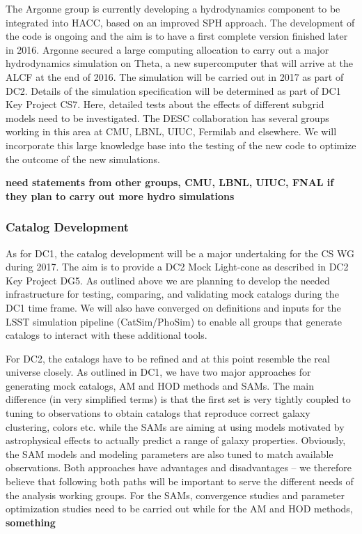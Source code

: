 The Argonne group is currently developing a hydrodynamics component to be integrated into HACC, based on an improved SPH approach. The development of the code is ongoing and the aim is to have a first complete version finished later in 2016. Argonne secured a large computing allocation to carry out a major hydrodynamics simulation on Theta, a new supercomputer that will arrive at the ALCF at the end of 2016. The simulation will be carried out in 2017 as part of DC2. Details of the simulation specification will be determined as part of DC1 Key Project CS7. Here, detailed tests about the effects of different subgrid models need to be investigated. The DESC collaboration has several groups working in this area at CMU, LBNL, UIUC, Fermilab and elsewhere. We will incorporate this large knowledge base into the testing of the new code to optimize the outcome of the new simulations.


{\bf need statements from other groups, CMU, LBNL, UIUC, FNAL if they plan to carry out more hydro simulations}

\subsubsection{Catalog Development}
\label{sec:keysims:dc2:dev}

As for DC1, the catalog development will be a major undertaking for the CS WG during 2017. The aim is to provide a DC2 Mock Light-cone as described in DC2 Key Project DG5. As outlined above we are planning to develop the needed infrastructure for testing, comparing, and validating mock catalogs during the DC1 time frame. We will also have converged on definitions and inputs for the LSST simulation pipeline (CatSim/PhoSim) to enable all groups that generate catalogs to interact with these additional tools. 

For DC2, the catalogs have to be refined and at this point resemble the real universe closely. As outlined in DC1, we have two major approaches for generating mock catalogs, AM and HOD methods and SAMs. The main difference (in very simplified terms) is that the first set is very tightly coupled to tuning to observations to obtain catalogs that reproduce correct galaxy clustering, colors etc. while the SAMs are aiming at using models motivated by astrophysical effects to actually predict a range of galaxy properties. Obviously, the SAM models and modeling parameters are also tuned to match available observations. Both approaches have advantages and disadvantages -- we therefore believe that following both paths will be important to serve the different needs of the analysis working groups. For the SAMs, convergence studies and parameter optimization studies need to be carried out while for the AM and HOD methods, {\bf something}

